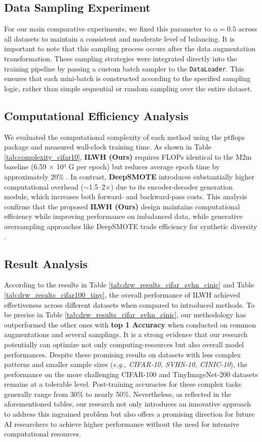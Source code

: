 \subsection{Data Sampling Experiment}

For our main comparative experiments, we fixed this parameter to \(\alpha=0.5\) across all datasets to maintain a consistent and moderate level of balancing. It is important to note that this sampling process occurs after the data augmentation transformation. These sampling strategies were integrated directly into the training pipeline by passing a custom batch sampler to the \texttt{DataLoader}. This ensures that each mini-batch is constructed according to the specified sampling logic, rather than simple sequential or random sampling over the entire dataset.

\subsection{Computational Efficiency Analysis}

We evaluated the computational complexity of each method using the ptflops package and measured wall-clock training time. As shown in Table \ref{tab:complexity_cifar10}, \textbf{ILWH (Ours)} requires FLOPs identical to the M2m baseline (6.59 × 10³ G per epoch) but reduces average epoch time by approximately 20\% . In contrast, \textbf{DeepSMOTE} introduces substantially higher computational overhead ($\sim$1.5--2$\times$) due to its encoder-decoder generation module, which increases both forward- and backward-pass costs. This analysis confirms that the proposed \textbf{ILWH (Ours)} design maintains computational efficiency while improving performance on imbalanced data, while generative oversampling approaches like DeepSMOTE trade efficiency for synthetic diversity \cite{dablain2022deepsmote}.

\subsection{Result Analysis}
According  to the results in  Table \ref{tab:drw_results_cifar_svhn_cinic} and Table \ref{tab:drw_results_cifar100_tiny}, the overall performance of  ILWH achieved effectiveness across different  datasets when compared to introduced methods. To be precise in Table  \ref{tab:drw_results_cifar_svhn_cinic}, our methodology has outperformed the other ones with \textbf{top 1 Accuracy} when conducted on common augmentations and several samplings. It is a strong  evidence that our research potentially can optimize not only computing-resources but also overall model performances. Despite these promising results on datasets with less complex patterns and smaller sample sizes (\textit{e.g., CIFAR-10, SVHN-10, CINIC-10}), the performance on the more challenging CIFAR-100 and TinyImageNet-200 datasets remains at a tolerable level. Post-training accuracies for these complex tasks generally range from 30\% to nearly 50\%. Nevertheless, as reflected in the aforementioned tables, our research not only introduces an innovative approach to address this ingrained problem but also offers a promising direction for future AI researchers to achieve higher performance without the need for intensive computational resources.

